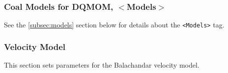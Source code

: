 \subsubsection{Coal Models for DQMOM, $<$Models$>$}
See the \ref{subsec:models} section below for details about the \verb=<Models>= tag.






\subsubsection{Velocity Model}
%
This section sets parameters for the Balachandar velocity model.
%
